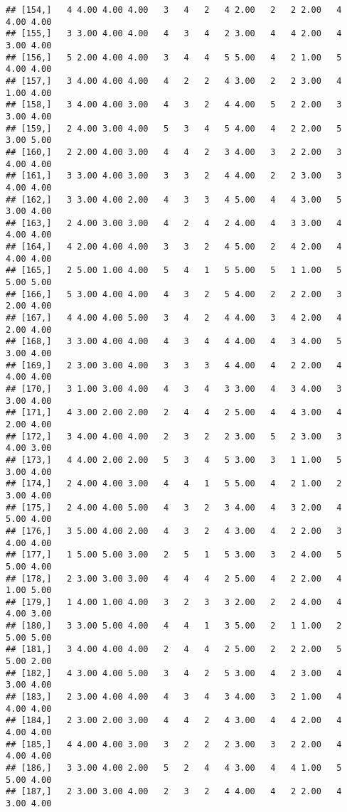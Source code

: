 \documentclass[]{article}
\begin{document}
\begin{verbatim}
## [154,]   4 4.00 4.00 4.00   3   4   2   4 2.00   2   2 2.00   4 4.00 4.00
## [155,]   3 3.00 4.00 4.00   4   3   4   2 3.00   4   4 2.00   4 3.00 4.00
## [156,]   5 2.00 4.00 4.00   3   4   4   5 5.00   4   2 1.00   5 4.00 4.00
## [157,]   3 4.00 4.00 4.00   4   2   2   4 3.00   2   2 3.00   4 1.00 4.00
## [158,]   3 4.00 4.00 3.00   4   3   2   4 4.00   5   2 2.00   3 3.00 4.00
## [159,]   2 4.00 3.00 4.00   5   3   4   5 4.00   4   2 2.00   5 3.00 5.00
## [160,]   2 2.00 4.00 3.00   4   4   2   3 4.00   3   2 2.00   3 4.00 4.00
## [161,]   3 3.00 4.00 3.00   3   3   2   4 4.00   2   2 3.00   3 4.00 4.00
## [162,]   3 3.00 4.00 2.00   4   3   3   4 5.00   4   4 3.00   5 3.00 4.00
## [163,]   2 4.00 3.00 3.00   4   2   4   2 4.00   4   3 3.00   4 4.00 4.00
## [164,]   4 2.00 4.00 4.00   3   3   2   4 5.00   2   4 2.00   4 4.00 4.00
## [165,]   2 5.00 1.00 4.00   5   4   1   5 5.00   5   1 1.00   5 5.00 5.00
## [166,]   5 3.00 4.00 4.00   4   3   2   5 4.00   2   2 2.00   3 2.00 4.00
## [167,]   4 4.00 4.00 5.00   3   4   2   4 4.00   3   4 2.00   4 2.00 4.00
## [168,]   3 3.00 4.00 4.00   4   3   4   4 4.00   4   3 4.00   5 3.00 4.00
## [169,]   2 3.00 3.00 4.00   3   3   3   4 4.00   4   2 2.00   4 4.00 4.00
## [170,]   3 1.00 3.00 4.00   4   3   4   3 3.00   4   3 4.00   3 3.00 4.00
## [171,]   4 3.00 2.00 2.00   2   4   4   2 5.00   4   4 3.00   4 2.00 4.00
## [172,]   3 4.00 4.00 4.00   2   3   2   2 3.00   5   2 3.00   3 4.00 3.00
## [173,]   4 4.00 2.00 2.00   5   3   4   5 3.00   3   1 1.00   5 3.00 4.00
## [174,]   2 4.00 4.00 3.00   4   4   1   5 5.00   4   2 1.00   2 3.00 4.00
## [175,]   2 4.00 4.00 5.00   4   3   2   3 4.00   4   3 2.00   4 5.00 4.00
## [176,]   3 5.00 4.00 2.00   4   3   2   4 3.00   4   2 2.00   3 4.00 4.00
## [177,]   1 5.00 5.00 3.00   2   5   1   5 3.00   3   2 4.00   5 5.00 4.00
## [178,]   2 3.00 3.00 3.00   4   4   4   2 5.00   4   2 2.00   4 1.00 5.00
## [179,]   1 4.00 1.00 4.00   3   2   3   3 2.00   2   2 4.00   4 4.00 3.00
## [180,]   3 3.00 5.00 4.00   4   4   1   3 5.00   2   1 1.00   2 5.00 5.00
## [181,]   3 4.00 4.00 4.00   2   4   4   2 5.00   2   2 2.00   5 5.00 2.00
## [182,]   4 3.00 4.00 5.00   3   4   2   5 3.00   4   2 3.00   4 3.00 4.00
## [183,]   2 3.00 4.00 4.00   4   3   4   3 4.00   3   2 1.00   4 4.00 4.00
## [184,]   2 3.00 2.00 3.00   4   4   2   4 3.00   4   4 2.00   4 4.00 4.00
## [185,]   4 4.00 4.00 3.00   3   2   2   2 3.00   3   2 2.00   4 4.00 4.00
## [186,]   3 3.00 4.00 2.00   5   2   4   4 3.00   4   4 1.00   5 5.00 4.00
## [187,]   2 3.00 3.00 4.00   2   3   2   4 4.00   4   2 2.00   4 3.00 4.00

\end{verbatim}
\end{document}
